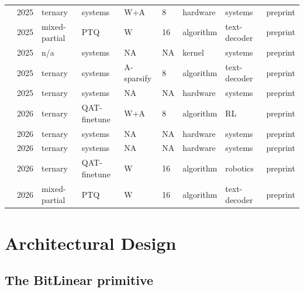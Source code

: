 \documentclass[11pt]{article}
\begin{document}
\begin{landscape}
\begin{longtable}{p{3.2cm} p{1cm} p{1.9cm} p{2.2cm} p{2.2cm} p{1.3cm} p{2.2cm} p{2.1cm} p{2.5cm}}
\citet{Malhotra2025-ReTern} & 2025 & ternary & systems & W+\allowbreak{}A & 8 & hardware & systems & preprint \\
\citet{Xiao2025-LieQ} & 2025 & mixed-partial & PTQ & W & 16 & algorithm & text-decoder & preprint \\
\citet{Georganas2025-UltraLowBitKernels} & 2025 & n/\allowbreak{}a & systems & NA & NA & kernel & systems & preprint \\
\citet{Qi2025-DeltaLLM} & 2025 & ternary & systems & A-sparsify & 8 & algorithm & text-decoder & preprint \\
\citet{Zhang2025-PDSwap} & 2025 & ternary & systems & NA & NA & hardware & systems & preprint \\
\citet{Sajid2026-BitRL} & 2026 & ternary & QAT-finetune & W+\allowbreak{}A & 8 & algorithm & RL & preprint \\
\citet{Geens2026-LUTAccelDesign} & 2026 & ternary & systems & NA & NA & hardware & systems & preprint \\
\citet{Lin2026-VitaLLM} & 2026 & ternary & systems & NA & NA & hardware & systems & preprint \\
\citet{Kang2026-BitTP} & 2026 & ternary & QAT-finetune & W & 16 & algorithm & robotics & preprint \\
\citet{Abdalla2026-SAGEPTQ} & 2026 & mixed-partial & PTQ & W & 16 & algorithm & text-decoder & preprint \\
\end{longtable}
\endgroup
\end{landscape}


\section{Architectural Design}

\subsection{The BitLinear primitive}
\end{document}
